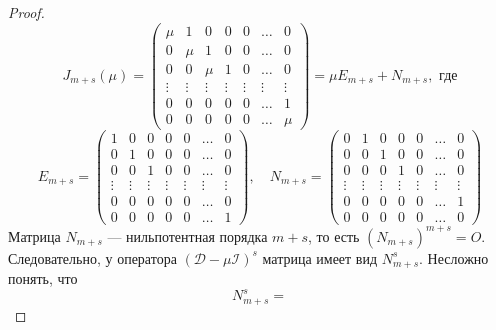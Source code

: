 \documentclass[11pt]{article}
\begin{document}
\begin{proof}
    \begin{equation*}
        J_{m + s}(\mu) = 
        \begin{pmatrix}
            \mu & 1 & 0 & 0 & 0 & \ldots & 0 \\
            0 & \mu & 1 & 0 & 0 & \ldots & 0 \\
            0 & 0 & \mu & 1 & 0 & \ldots & 0 \\
            \vdots & \vdots & \vdots & \vdots & \vdots & \vdots & \vdots \\
            0 & 0 & 0 & 0 & 0 & \ldots & 1 \\
            0 & 0 & 0 & 0 & 0 & \ldots & \mu
        \end{pmatrix}
        = \mu E_{m + s} + N_{m + s}, \text{ где}
    \end{equation*}
    \begin{equation*}
        E_{m + s} = 
        \begin{pmatrix}
            1 & 0 & 0 & 0 & 0 & \ldots & 0 \\
            0 & 1 & 0 & 0 & 0 & \ldots & 0 \\
            0 & 0 & 1 & 0 & 0 & \ldots & 0 \\
            \vdots & \vdots & \vdots & \vdots & \vdots & \vdots & \vdots \\
            0 & 0 & 0 & 0 & 0 & \ldots & 0 \\
            0 & 0 & 0 & 0 & 0 & \ldots & 1
        \end{pmatrix}
        , \quad N_{m + s} = 
        \begin{pmatrix}
            0 & 1 & 0 & 0 & 0 & \ldots & 0 \\
            0 & 0 & 1 & 0 & 0 & \ldots & 0 \\
            0 & 0 & 0 & 1 & 0 & \ldots & 0 \\
            \vdots & \vdots & \vdots & \vdots & \vdots & \vdots & \vdots \\
            0 & 0 & 0 & 0 & 0 & \ldots & 1 \\
            0 & 0 & 0 & 0 & 0 & \ldots & 0
        \end{pmatrix}
    \end{equation*}
    Матрица $N_{m + s}$ --- нильпотентная порядка $m + s$, то есть $(N_{m + s})^{m + s} = O$. \\
    Следовательно, у оператора $(\mathcal{D} - \mu \mathcal{I})^s$ матрица имеет вид $N_{m + s}^s$. Несложно понять, что
    \begin{equation*}
        N_{m + s}^s = 

\end{equation*}
\end{proof}
\end{document}
